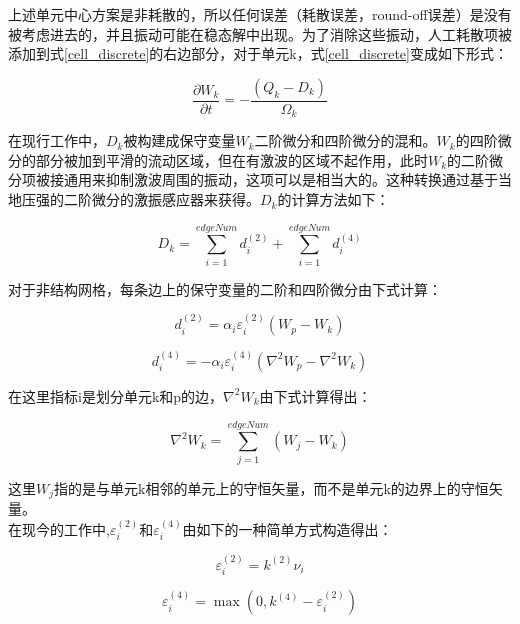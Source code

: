 \documentclass[UTF8]{ctexart}
\begin{document}
上述单元中心方案是非耗散的，所以任何误差（耗散误差，round-off误差）是没有被考虑进去的，并且振动可能在稳态解中出现。为了消除这些振动，人工耗散项被添加到式\eqref{cell_discrete}的右边部分，对于单元k，式\eqref{cell_discrete}变成如下形式：

\begin{equation}\label{aritificial_dissipation}
\frac{\partial W_k}{\partial t} = - \frac{(Q_k-D_k)}{\Omega_k}
\end{equation}

\indent 在现行工作中，$D_k$被构建成保守变量$W_k$二阶微分和四阶微分的混和。$W_k$的四阶微分的部分被加到平滑的流动区域，但在有激波的区域不起作用，此时$W_k$的二阶微分项被接通用来抑制激波周围的振动，这项可以是相当大的。这种转换通过基于当地压强的二阶微分的激振感应器来获得。$D_k$的计算方法如下：

\begin{equation}
D_k=\sum_{i=1}^{edgeNum}d_{i}^{(2)}+\sum_{i=1}^{edgeNum}d_{i}^{(4)}
\end{equation}

\indent 对于非结构网格，每条边上的保守变量的二阶和四阶微分由下式计算：

\begin{equation}
d_{i}^{(2)}=\alpha_i \varepsilon_{i}^{(2)} (W_p-W_k)
\end{equation}

\begin{equation}
d_{i}^{(4)}=-\alpha_i \varepsilon_{i}^{(4)} (\nabla^{2}W_p-\nabla^{2}W_k)
\end{equation}

\indent 在这里指标i是划分单元k和p的边，$\nabla^{2}W_k$由下式计算得出：

\begin{equation}
\nabla^{2}W_k=\sum_{j=1}^{edgeNum}(W_j-W_k)
\end{equation}

\indent 这里$W_j$指的是与单元k相邻的单元上的守恒矢量，而不是单元k的边界上的守恒矢量。\\
\indent 在现今的工作中,$\varepsilon_{i}^{(2)}$和$\varepsilon_{i}^{(4)}$由如下的一种简单方式构造得出：

\begin{equation}
\varepsilon_{i}^{(2)}=k^{(2)}\nu_i
\end{equation}

\begin{equation}
\varepsilon_{i}^{(4)}=\max(0,k^{(4)}-\varepsilon_{i}^{(2)})
\end{equation}
\end{document}
